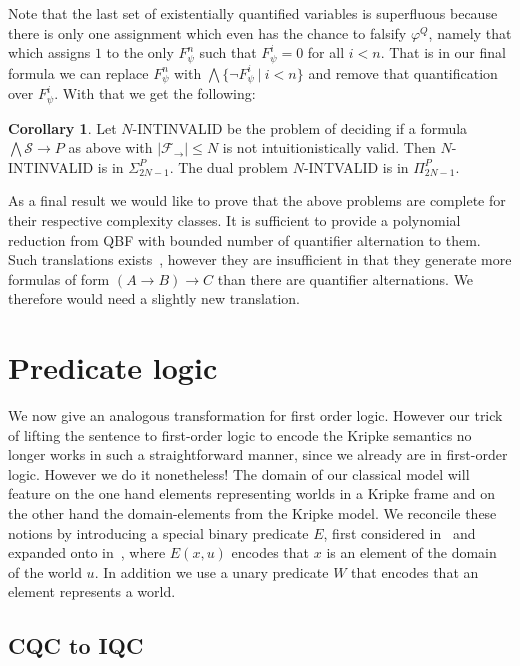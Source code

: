 \documentclass[a4paper,12pt]{report}
\theoremstyle{definition}
\theoremstyle{definition}
\newtheorem{corollary}[theorem]{Corollary}
\theoremstyle{definition}
\theoremstyle{definition}
\theoremstyle{definition}
\theoremstyle{definition}
\theoremstyle{definition}
\begin{document}
	Note that the last set of existentially quantified variables is superfluous because there is only one assignment which even has the chance to falsify $\varphi^Q$, namely that which assigns $1$ to the only $F_\psi^n$ such that $F_\psi^i = 0$ for all $i < n$. That is in our final formula we can replace $F_\psi^n$ with $\bigwedge\{\neg F_\psi^i\:|\:i < n\}$ and remove that quantification over $F_\psi^i$. With that we get the following:
	
	\begin{corollary}
		Let $N$-INTINVALID be the problem of deciding if a formula $\bigwedge \mathcal S\to P$ as above with $|\mathcal F_\to|\leq N$ is not intuitionistically valid. Then $N$-INTINVALID is in $\Sigma_{2N-1}^P$. The dual problem $N$-INTVALID is in $\Pi_{2N-1}^P$.
	\end{corollary}

	As a final result we would like to prove that the above problems are complete for their respective complexity classes. It is sufficient to provide a polynomial reduction from QBF with bounded number of quantifier alternation to them. Such translations exists~\cite{statman1979intuitionistic,vsvejdar2003polynomial}, however they are insufficient in that they generate more formulas of form $(A\to B)\to C$ than there are quantifier alternations. We therefore would need a slightly new translation.

	\section{Predicate logic}
	
	We now give an analogous transformation for first order logic. However our trick of lifting the sentence to first-order logic to encode the Kripke semantics no longer works in such a straightforward manner, since we already are in first-order logic. However we do it nonetheless! The domain of our classical model will feature on the one hand elements representing worlds in a Kripke frame and on the other hand the domain-elements from the Kripke model. We reconcile these notions by introducing a special binary predicate $E$, first considered in~\cite{baaz2006skolemization} and expanded onto in~\cite{iemhoff2010eskolemization}, where $E(x, u)$ encodes that $x$ is an element of the domain of the world $u$. In addition we use a unary predicate $W$ that encodes that an element represents a world.
	
	\subsection{CQC to IQC}
\end{document}
